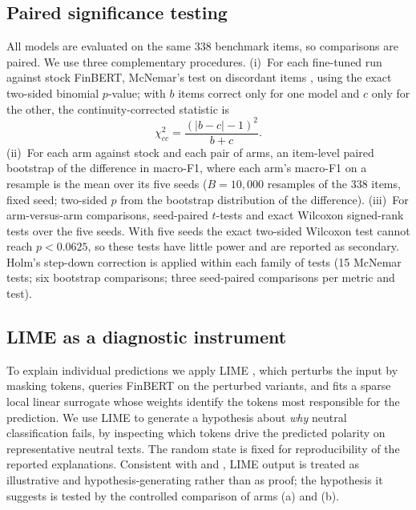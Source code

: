 \documentclass{aims}
\numberwithin{equation}{section}
\begin{document}
\subsection{Paired significance testing}\label{sec:sigtest}
All models are evaluated on the same 338 benchmark items, so comparisons are paired.
We use three complementary procedures. (i)~For each fine-tuned run against stock
FinBERT, McNemar's test on discordant items \citep{dietterich1998}, using the exact
two-sided binomial $p$-value; with $b$ items correct only for one model and $c$ only
for the other, the continuity-corrected statistic is
\begin{equation*}
\chi^2_{cc} = \frac{(|b-c|-1)^2}{b+c}.
\end{equation*}
(ii)~For each arm against stock and each pair of arms, an item-level paired
bootstrap \citep{efron1993} of the difference in macro-F1, where each arm's
macro-F1 on a resample is the mean over its five seeds ($B = 10{,}000$ resamples of
the 338 items, fixed seed; two-sided $p$ from the bootstrap distribution of the
difference). (iii)~For arm-versus-arm comparisons, seed-paired $t$-tests and exact
Wilcoxon signed-rank tests over the five seeds. With five seeds the exact two-sided
Wilcoxon test cannot reach $p < 0.0625$, so these tests have little power and are
reported as secondary. Holm's step-down correction is applied within each family
of tests (15 McNemar tests; six bootstrap comparisons; three seed-paired comparisons
per metric and test).

\subsection{LIME as a diagnostic instrument}\label{sec:limemethod}
To explain individual predictions we apply LIME \citep{ribeiro2016}, which perturbs
the input by masking tokens, queries FinBERT on the perturbed variants, and fits a
sparse local linear surrogate whose weights identify the tokens most responsible for
the prediction. We use LIME to generate a hypothesis about \emph{why} neutral
classification fails, by inspecting which tokens drive the predicted polarity on
representative neutral texts. The random state is fixed for reproducibility of the
reported explanations. Consistent with \citet{slack2020} and \citet{rudin2019}, LIME
output is treated as illustrative and hypothesis-generating rather than as proof;
the hypothesis it suggests is tested by the controlled comparison of arms (a) and (b).
\end{document}
